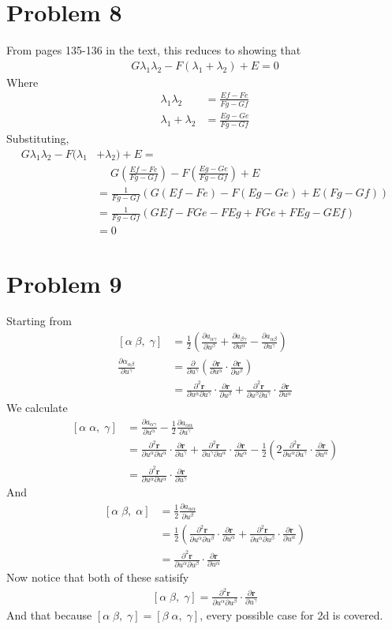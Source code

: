 \documentclass[12pt]{article}
\newcommand{\eq}[1]{\begin{align*}#1\end{align*}}
\newcommand{\p}[2]{\frac{\partial#1}{\partial#2}}
\newcommand{\pp}[3]{\frac{\partial^2#1}{\partial#2\partial#3}}
\newcommand{\crsf}[3]{\left[#1\;#2,\;#3\right]}
\begin{document}
\section*{Problem 8}
From pages 135-136 in the text, this reduces to showing that
\eq{
	G\lambda_1\lambda_2 - F(\lambda_1 + \lambda_2) + E = 0
}
Where
\eq{
	\lambda_1\lambda_2 &= \frac{Ef - Fe}{Fg - Gf}\\
	\lambda_1 + \lambda_2 &= \frac{Eg - Ge}{Fg - Gf}
}
Substituting,
\eq{
	G\lambda_1\lambda_2 - F(\lambda_1 &+ \lambda_2) + E = \\
	&\quad\; G\left(\frac{Ef - Fe}{Fg - Gf}\right) - F\left(\frac{Eg - Ge}{Fg - Gf}\right) + E\\
	&= \frac{1}{Fg - Gf}\left(G(Ef - Fe) - F(Eg - Ge) + E(Fg - Gf)\right)\\
	&= \frac{1}{Fg - Gf}\left(GEf - FGe - FEg + FGe + FEg - GEf\right)\\
	&= 0
}
\section*{Problem 9}
Starting from
\eq{
	\crsf{\alpha}{\beta}{\gamma} &= \frac{1}{2}\left(\p{a_{\alpha\gamma}}{u^\beta} + \p{a_{\beta\gamma}}{u^\alpha} - \p{a_{\alpha\beta}}{u^\gamma} \right)\\
	\p{\alpha_{\alpha\beta}}{u^\gamma} &= \p{}{u^\gamma}\left(\p{\bm{r}}{u^\alpha}\cdot\p{\bm{r}}{u^\beta}\right)\\
	&= \pp{\bm{r}}{u^\alpha}{u^\gamma}\cdot\p{\bm{r}}{u^\beta} + \pp{\bm{r}}{u^\beta}{u^\gamma}\cdot\p{\bm{r}}{u^\alpha}
}
We calculate
\eq{
	\crsf{\alpha}{\alpha}{\gamma} &= \p{a_{\alpha\gamma}}{u^\alpha} - \frac{1}{2}\p{a_{\alpha\alpha}}{u^\gamma}\\
	&= \pp{\bm{r}}{u^\alpha}{u^\alpha}\cdot\p{\bm{r}}{u^\gamma} + \pp{\bm{r}}{u^\gamma}{u^\alpha}\cdot\p{\bm{r}}{u^\alpha} - \frac{1}{2}\left(2\pp{\bm{r}}{u^\alpha}{u^\gamma}\cdot\p{\bm{r}}{u^\alpha}\right)\\
	&= \pp{\bm{r}}{u^\alpha}{u^\alpha}\cdot\p{\bm{r}}{u^\gamma}
}
And
\eq{
	\crsf{\alpha}{\beta}{\alpha} &= \frac{1}{2}\p{a_{\alpha\alpha}}{u^\beta}\\
	&= \frac{1}{2}\left(\pp{\bm{r}}{u^\alpha}{u^\beta}\cdot\p{\bm{r}}{u^\alpha} + \pp{\bm{r}}{u^\alpha}{u^\beta}\cdot\p{\bm{r}}{u^\alpha} \right)\\
	&= \pp{\bm{r}}{u^\alpha}{u^\beta}\cdot\p{\bm{r}}{u^\alpha}
}
Now notice that both of these satisify
\eq{
	\crsf{\alpha}{\beta}{\gamma} = \pp{\bm{r}}{u^\alpha}{u^\beta}\cdot\p{\bm{r}}{u^\gamma}
}
And that because $\crsf{\alpha}{\beta}{\gamma} = \crsf{\beta}{\alpha}{\gamma}$, every possible case for 2d is covered.
\end{document}
